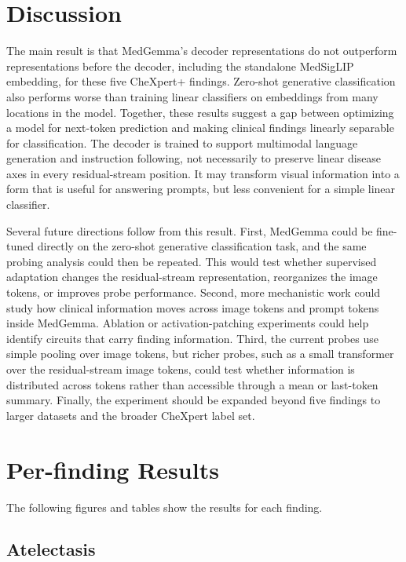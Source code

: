 \documentclass{article}
\begin{document}
\section{Discussion}

The main result is that MedGemma's decoder representations do not outperform representations before the decoder, including the standalone MedSigLIP embedding, for these five CheXpert+ findings.
Zero-shot generative classification also performs worse than training linear classifiers on embeddings from many locations in the model.
Together, these results suggest a gap between optimizing a model for next-token prediction and making clinical findings linearly separable for classification.
The decoder is trained to support multimodal language generation and instruction following, not necessarily to preserve linear disease axes in every residual-stream position.
It may transform visual information into a form that is useful for answering prompts, but less convenient for a simple linear classifier.

Several future directions follow from this result.
First, MedGemma could be fine-tuned directly on the zero-shot generative classification task, and the same probing analysis could then be repeated.
This would test whether supervised adaptation changes the residual-stream representation, reorganizes the image tokens, or improves probe performance.
Second, more mechanistic work could study how clinical information moves across image tokens and prompt tokens inside MedGemma.
Ablation or activation-patching experiments could help identify circuits that carry finding information.
Third, the current probes use simple pooling over image tokens, but richer probes, such as a small transformer over the residual-stream image tokens, could test whether information is distributed across tokens rather than accessible through a mean or last-token summary.
Finally, the experiment should be expanded beyond five findings to larger datasets and the broader CheXpert label set.

\printbibliography

\newpage
\appendix

\section{Per-finding Results}

The following figures and tables show the results for each finding.

\subsection{Atelectasis}
\end{document}
